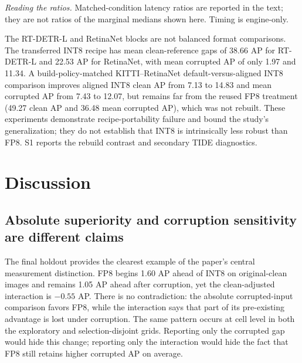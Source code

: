 \documentclass[a4paper,fleqn]{cas-dc}
\begin{document}
\begin{table}[t]
\centering
\caption{TensorRT engine measurements on the RTX 5090. Values for each condition are medians of three runs; each row summarizes 12 corresponding YOLO conditions.}
\label{tab:runtime}
\small
\setlength{\tabcolsep}{3pt}
\renewcommand{\arraystretch}{1.18}

\par\vspace{3pt}\begin{minipage}{\columnwidth}\footnotesize
\textit{Reading the ratios.} Matched-condition latency ratios are reported in the text; they are not ratios of the marginal medians shown here. Timing is engine-only.
\end{minipage}
\end{table}

The RT-DETR-L and RetinaNet blocks are not balanced format comparisons. The transferred INT8 recipe has mean clean-reference gaps of 38.66 AP for RT-DETR-L and 22.53 AP for RetinaNet, with mean corrupted AP of only 1.97 and 11.34. A build-policy-matched KITTI--RetinaNet default-versus-aligned INT8 comparison improves aligned INT8 clean AP from 7.13 to 14.83 and mean corrupted AP from 7.43 to 12.07, but remains far from the reused FP8 treatment (49.27 clean AP and 36.48 mean corrupted AP), which was not rebuilt. These experiments demonstrate recipe-portability failure and bound the study's generalization; they do not establish that INT8 is intrinsically less robust than FP8. S1 reports the rebuild contrast and secondary TIDE diagnostics.

\section{Discussion}
\label{sec:discussion}

\subsection{Absolute superiority and corruption sensitivity are different claims}

The final holdout provides the clearest example of the paper's central measurement distinction. FP8 begins 1.60 AP ahead of INT8 on original-clean images and remains 1.05 AP ahead after corruption, yet the clean-adjusted interaction is $-0.55$ AP. There is no contradiction: the absolute corrupted-input comparison favors FP8, while the interaction says that part of its pre-existing advantage is lost under corruption. The same pattern occurs at cell level in both the exploratory and selection-disjoint grids. Reporting only the corrupted gap would hide this change; reporting only the interaction would hide the fact that FP8 still retains higher corrupted AP on average.
\end{document}
